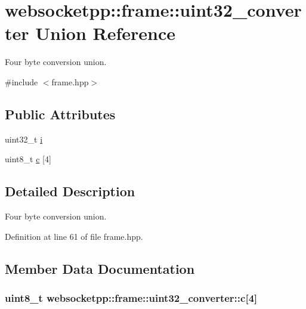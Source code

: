\hypertarget{unionwebsocketpp_1_1frame_1_1uint32__converter}{}\section{websocketpp\+:\+:frame\+:\+:uint32\+\_\+converter Union Reference}
\label{unionwebsocketpp_1_1frame_1_1uint32__converter}


Four byte conversion union.  




{\ttfamily \#include $<$frame.\+hpp$>$}

\subsection*{Public Attributes}
\begin{DoxyCompactItemize}
\item 
uint32\+\_\+t \hyperlink{unionwebsocketpp_1_1frame_1_1uint32__converter_a2bceb785be148d7c9b9ce11240595440}{i}
\item 
uint8\+\_\+t \hyperlink{unionwebsocketpp_1_1frame_1_1uint32__converter_ad7e9db5dd4002d78e9aaf624d39fd69c}{c} \mbox{[}4\mbox{]}
\end{DoxyCompactItemize}


\subsection{Detailed Description}
Four byte conversion union. 

Definition at line 61 of file frame.\+hpp.



\subsection{Member Data Documentation}
\hypertarget{unionwebsocketpp_1_1frame_1_1uint32__converter_ad7e9db5dd4002d78e9aaf624d39fd69c}{}
\subsubsection[{c}]{\setlength{\rightskip}{0pt plus 5cm}uint8\+\_\+t websocketpp\+::frame\+::uint32\+\_\+converter\+::c\mbox{[}4\mbox{]}}\label{unionwebsocketpp_1_1frame_1_1uint32__converter_ad7e9db5dd4002d78e9aaf624d39fd69c}


